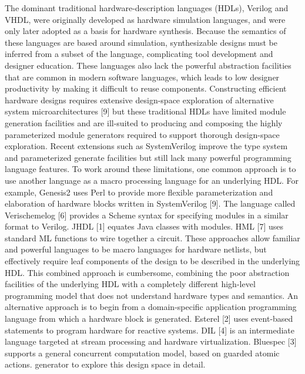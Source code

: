 The dominant traditional hardware-description languages
(HDLs), Verilog and VHDL, were originally developed as
hardware simulation languages, and were only later adopted
as a basis for hardware synthesis. Because the semantics of
these languages are based around simulation, synthesizable
designs must be inferred from a subset of the language, complicating tool development and designer education. These
languages also lack the powerful abstraction facilities that
are common in modern software languages, which leads to
low designer productivity by making it difficult to reuse components. Constructing efficient hardware designs requires
extensive design-space exploration of alternative system microarchitectures [9] but these traditional HDLs have limited
module generation facilities and are ill-suited to producing
and composing the highly parameterized module generators
required to support thorough design-space exploration. Recent extensions such as SystemVerilog improve the type system and parameterized generate facilities but still lack many
powerful programming language features.
To work around these limitations, one common approach
is to use another language as a macro processing language
for an underlying HDL. For example, Genesis2 uses Perl to
provide more flexible parameterization and elaboration of
hardware blocks written in SystemVerilog [9]. The language
called Verischemelog [6] provides a Scheme syntax for specifying modules in a similar format to Verilog. JHDL [1]
equates Java classes with modules. HML [7] uses standard
ML functions to wire together a circuit. These approaches
allow familiar and powerful languages to be macro languages
for hardware netlists, but effectively require leaf components
of the design to be described in the underlying HDL. This
combined approach is cumbersome, combining the poor abstraction facilities of the underlying HDL with a completely
different high-level programming model that does not understand hardware types and semantics.
An alternative approach is to begin from a domain-specific
application programming language from which a hardware
block is generated. Esterel [2] uses event-based statements
to program hardware for reactive systems. DIL [4] is an intermediate language targeted at stream processing and hardware virtualization. Bluespec [3] supports a general concurrent computation model, based on guarded atomic actions.
generator to explore this design space in detail.


